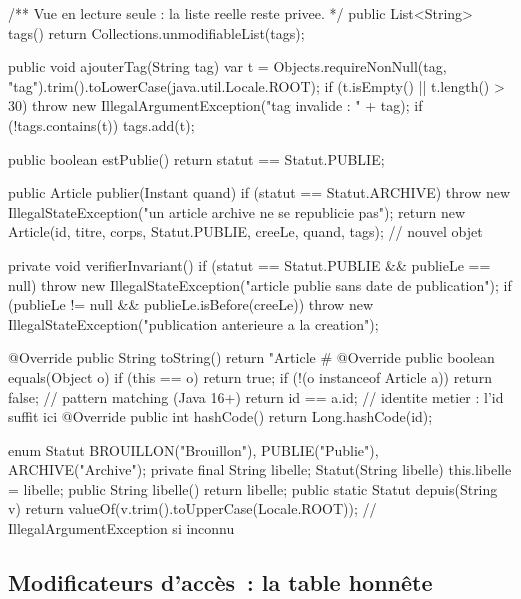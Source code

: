 \documentclass[12pt,a4paper,twoside,openright]{book}
\begin{document}
\begin{codejava}
{    /** Vue en lecture seule : la liste reelle reste privee. */
    public List<String> tags() { return Collections.unmodifiableList(tags); }

    public void ajouterTag(String tag) {
        var t = Objects.requireNonNull(tag, "tag").trim().toLowerCase(java.util.Locale.ROOT);
        if (t.isEmpty() || t.length() > 30) { throw new IllegalArgumentException("tag invalide : " + tag); }
        if (!tags.contains(t)) { tags.add(t); }
    }

    public boolean estPublie() { return statut == Statut.PUBLIE; }

    public Article publier(Instant quand) {
        if (statut == Statut.ARCHIVE) { throw new IllegalStateException("un article archive ne se republicie pas"); }
        return new Article(id, titre, corps, Statut.PUBLIE, creeLe, quand, tags);  // nouvel objet
    }

    private void verifierInvariant() {
        if (statut == Statut.PUBLIE && publieLe == null) {
            throw new IllegalStateException("article publie sans date de publication");
        }
        if (publieLe != null && publieLe.isBefore(creeLe)) {
            throw new IllegalStateException("publication anterieure a la creation");
        }
    }

    @Override public String toString() {
        return "Article #%
    }
    @Override public boolean equals(Object o) {
        if (this == o) { return true; }
        if (!(o instanceof Article a)) { return false; }   // pattern matching (Java 16+)
        return id == a.id;                                  // identite metier : l'id suffit ici
    }
    @Override public int hashCode() { return Long.hashCode(id); }
}

enum Statut {
    BROUILLON("Brouillon"), PUBLIE("Publie"), ARCHIVE("Archive");
    private final String libelle;
    Statut(String libelle) { this.libelle = libelle; }
    public String libelle() { return libelle; }
    public static Statut depuis(String v) {
        return valueOf(v.trim().toUpperCase(Locale.ROOT));      // IllegalArgumentException si inconnu
    }
}
\end{codejava}

\subsection{Modificateurs d'acc\`es~: la table honn\^ete}
\end{document}
